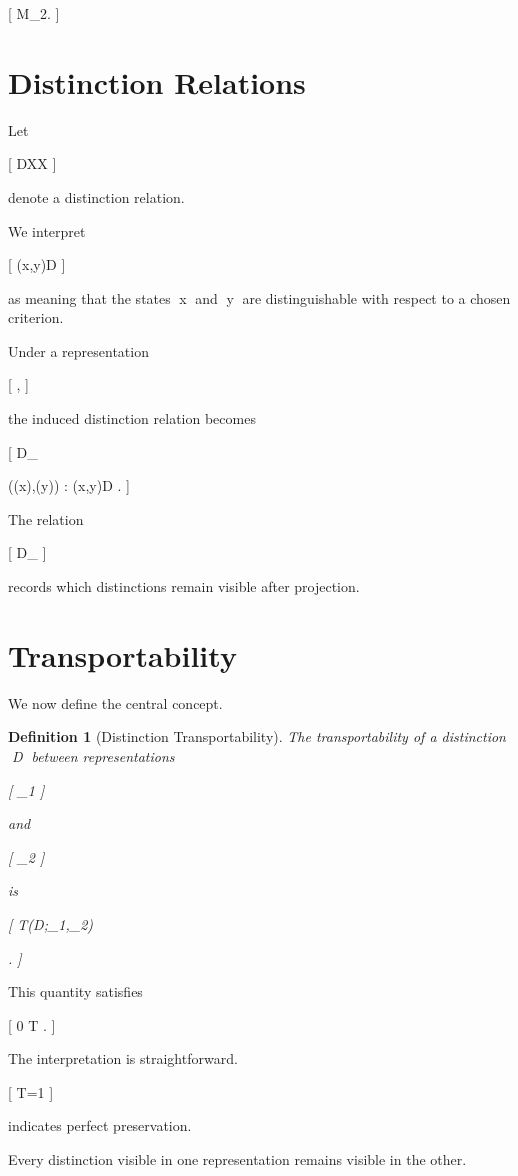 \documentclass[11pt,oneside,openany]{book}
\newtheorem{definition}{Definition}[chapter] \newtheorem{theorem}{Theorem}[chapter] \newtheorem{proposition}{Proposition}[chapter] \newtheorem{lemma}{Lemma}[chapter] \newtheorem{corollary}{Corollary}[chapter] \newtheorem{remark}{Remark}[chapter]
\begin{document}
[
M_2.
]

\section{Distinction Relations}

Let

[
D\subseteq X\times X
]

denote a distinction relation.

We interpret

[
(x,y)\in D
]

as meaning that the states x and y are distinguishable with respect to a chosen criterion.

Under a representation

[
\pi,
]

the induced distinction relation becomes

[
D_\pi

{
(\pi(x),\pi(y))
:
(x,y)\in D
}.
]

The relation

[
D_\pi
]

records which distinctions remain visible after projection.

\section{Transportability}

We now define the central concept.

\begin{definition}[Distinction Transportability]

The transportability of a distinction D between representations

[
\pi_1
]

and

[
\pi_2
]

is

[
T(D;\pi_1,\pi_2)

.
]

\end{definition}

This quantity satisfies

[
0
\le
T
.
]

The interpretation is straightforward.

[
T=1
]

indicates perfect preservation.

Every distinction visible in one representation remains visible in the other.
\end{document}
